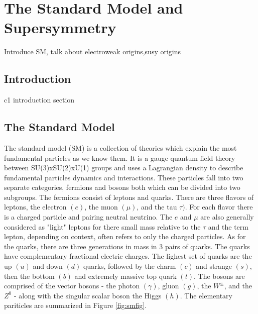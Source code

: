 



\setcounter{secnumdepth}{3}
\setcounter{tocdepth}{3}
\setlength{\parskip}{\smallskipamount}
\setlength{\parindent}{0pt}


\makeatletter


\providecommand{\tabularnewline}{\\}


\makeatother

%

\chapter{The Standard Model and Supersymmetry}

\begin{chapterabstract}
Introduce SM, talk about electroweak origins,susy origins
\end{chapterabstract}

\section{Introduction}

c1 introduction section

\section{The Standard Model}

The standard model (SM) is a collection of theories which explain the most fundamental particles as we know them. It is a gauge quantum field theory between SU(3)xSU(2)xU(1) groups and uses a Lagrangian density to describe fundamental particles  dynamics and interactions. These particles fall into two separate categories, fermions and bosons both which can be divided into two subgroups. The fermions consist of leptons and quarks. There are three flavors of leptons, the electron $(e)$, the muon $(\mu)$, and the tau $\tau)$. For each flavor there is a charged particle and pairing neutral neutrino. The $e$ and $\mu$ are also generally considered as "light" leptons for there small mass relative to the $\tau$ and the term lepton, depending on context, often refers to only the charged particles. As for the quarks, there are three generations in mass in 3 pairs of quarks. The quarks have complementary fractional electric charges. The lighest set of quarks are the up $(u)$ and down $(d)$ quarks, followed by the charm $(c)$ and strange $(s)$, then the bottom $(b)$ and extremely massive top quark $(t)$.  The bosons are comprised of the vector bosons - the photon $(\gamma)$, gluon $(g)$, the $W^\pm$, and the $Z^0$ - along with the singular scalar boson the Higgs $(h)$. The elementary pariticles are summarized in Figure \ref{fig:smfig}.

